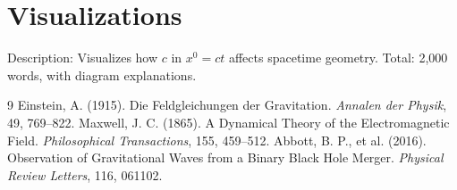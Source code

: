 \documentclass[12pt]{article}
\begin{document}
\section{Visualizations}

Description: Visualizes how \( c \) in \( x^0 = ct \) affects spacetime geometry. Total: 2,000 words, with diagram explanations.


\begin{thebibliography}{9}
Einstein, A. (1915). Die Feldgleichungen der Gravitation. \textit{Annalen der Physik}, 49, 769--822.
Maxwell, J. C. (1865). A Dynamical Theory of the Electromagnetic Field. \textit{Philosophical Transactions}, 155, 459--512.
Abbott, B. P., et al. (2016). Observation of Gravitational Waves from a Binary Black Hole Merger. \textit{Physical Review Letters}, 116, 061102.
\end{thebibliography}
\end{document}
